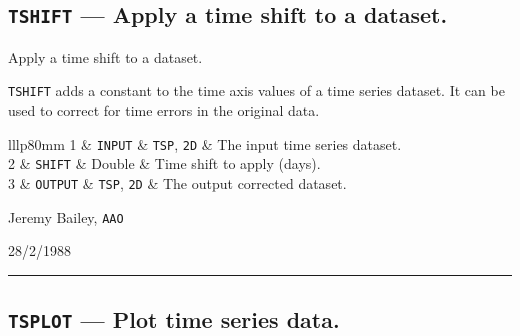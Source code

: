 \documentclass[11pt,twoside]{article}
\makeatletter
\renewcommand{\_}{\texttt{\symbol{95}}}
\newcommand{\manrule}{\rule{\textwidth}{0.5mm}}
\newcommand{\manroutine}[3]{\subsection{#1 --- #2}}
\newenvironment{manroutinedescription}{\begin{description}}{\end{description}%
\manrule}
\newcommand{\manroutineitem}[2]{\item[#1:] #2\mbox{}}
\newcommand{\manparametercols}{lllp{80mm}}
\newcommand{\manparameterorder}[3]{#1 & #2 & #3 & }
\newcommand{\manparametertop}{}
\newcommand{\manparameterbottom}{}
\newenvironment{manparametertable}{\gdef\manparameter@ss{}%
\gdef\manparameter@hl{}\hspace*{\fill}\vspace*{-\partopsep}\begin{trivlist}%
\item[]\begin{tabular}{\manparametercols}\manparametertop}{\manparameterbottom%
\end{tabular}\end{trivlist}}
\newcommand{\manparameterentry}[3]{\manparameter@ss\gdef\manparameter@ss{\\}%
\gdef\manparameter@hl{\hline}\manparameterorder{#1}{#2}{#3}}
\newcommand{\mantt}{\tt}
\makeatother
\begin{document}
\manroutine{{\mantt{TSHIFT}}}{Apply a time shift to a dataset.}{TSHIFT}
\begin{manroutinedescription}
\manroutineitem{Function}{}
        Apply a time shift to a dataset.

\manroutineitem{Description}{}
        {\mantt{TSHIFT}} adds a constant to the time axis values of a time
        series dataset. It can be used to correct for time errors
        in the original data.

\manroutineitem{Parameters}{}
\begin{manparametertable}
\manparameterentry{1}{{\mantt{INPUT}}}{{\mantt{TSP}}, {\mantt{2D}}}  The input %
time series dataset.
\manparameterentry{2}{{\mantt{SHIFT}}}{Double}   Time shift to apply (days).
\manparameterentry{3}{{\mantt{OUTPUT}}}{{\mantt{TSP}}, {\mantt{2D}}}  The %
output corrected dataset.

\end{manparametertable}
\manroutineitem{Support}{}
         Jeremy Bailey, {\mantt{AAO}}

\manroutineitem{Version date}{}
         28/2/1988

\end{manroutinedescription}
\manroutine{{\mantt{TSPLOT}}}{Plot time series data.}{TSPLOT}
\end{document}
